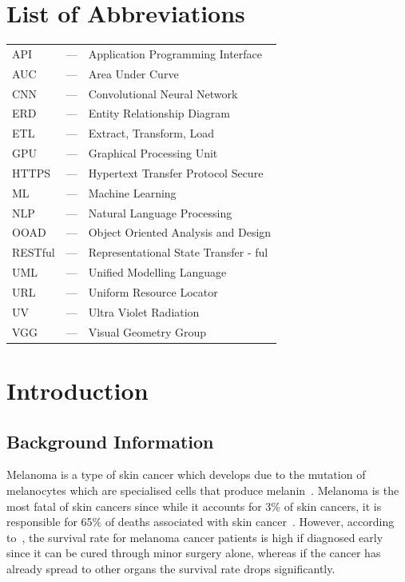 \documentclass[12pt, a4paper]{article}
\begin{document}
\section*{List of Abbreviations}
\begin{tabular}{l l l}
    API     & --- & Application Programming Interface     \\
    AUC     & --- & Area Under Curve                      \\
    CNN     & --- & Convolutional Neural Network          \\
    ERD     & --- & Entity Relationship Diagram           \\
    ETL     & --- & Extract, Transform, Load              \\
    GPU     & --- & Graphical Processing Unit             \\
    HTTPS   & --- & Hypertext Transfer Protocol Secure    \\
    ML      & --- & Machine Learning                      \\
    NLP     & --- & Natural Language Processing           \\
    OOAD    & --- & Object Oriented Analysis and Design   \\
    RESTful & --- & Representational State Transfer - ful \\
    UML     & --- & Unified Modelling Language            \\
    URL     & --- & Uniform Resource Locator              \\
    UV      & --- & Ultra Violet Radiation                \\
    VGG     & --- & Visual Geometry Group
\end{tabular}

\clearpage
{}
\section{Introduction}
\subsection{Background Information}
Melanoma is a type of skin cancer which develops due to the mutation of melanocytes which are specialised cells that produce melanin~\citep{domingues2018melanoma}. Melanoma is the most fatal of skin cancers since while it accounts for 3\% of skin cancers, it is responsible for 65\% of deaths associated with skin cancer~\citep{dzwierzynski2013managing}. However, according to~\cite{davis2019current}, the survival rate for melanoma cancer patients is high if diagnosed early since it can be cured through minor surgery alone, whereas if the cancer has already spread to other organs the survival rate drops significantly.
\end{document}
